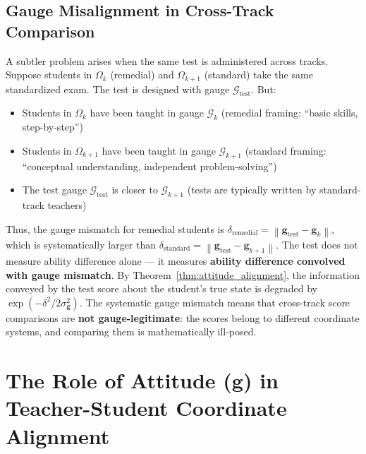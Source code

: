 \documentclass[11pt,a4paper]{article}
\newcommand{\cG}{\mathcal{G}}
\newcommand{\norm}[1]{\left\lVert#1\right\rVert}
\begin{document}
\subsection{Gauge Misalignment in Cross-Track Comparison}
A subtler problem arises when the same test is administered across tracks. Suppose students in $\Omega_k$ (remedial) and $\Omega_{k+1}$ (standard) take the same standardized exam. The test is designed with gauge $\cG_{\text{test}}$. But:
\begin{itemize}
    \item Students in $\Omega_k$ have been taught in gauge $\cG_k$ (remedial framing: ``basic skills, step-by-step'')
    \item Students in $\Omega_{k+1}$ have been taught in gauge $\cG_{k+1}$ (standard framing: ``conceptual understanding, independent problem-solving'')
    \item The test gauge $\cG_{\text{test}}$ is closer to $\cG_{k+1}$ (tests are typically written by standard-track teachers)
\end{itemize}
Thus, the gauge mismatch for remedial students is $\delta_{\text{remedial}} = \norm{\mathbf{g}_{\text{test}} - \mathbf{g}_k}$, which is systematically larger than $\delta_{\text{standard}} = \norm{\mathbf{g}_{\text{test}} - \mathbf{g}_{k+1}}$. The test does not measure ability difference alone — it measures \textbf{ability difference convolved with gauge mismatch}.
By Theorem~\ref{thm:attitude_alignment}, the information conveyed by the test score about the student's true state is degraded by $\exp(-\delta^2 / 2\sigma_{\mathbf{g}}^2)$. The systematic gauge mismatch means that cross-track score comparisons are \textbf{not gauge-legitimate}: the scores belong to different coordinate systems, and comparing them is mathematically ill-posed.
\section{The Role of Attitude ($\mathbf{g}$) in Teacher-Student Coordinate Alignment}
\label{sec:attitude}
\end{document}
